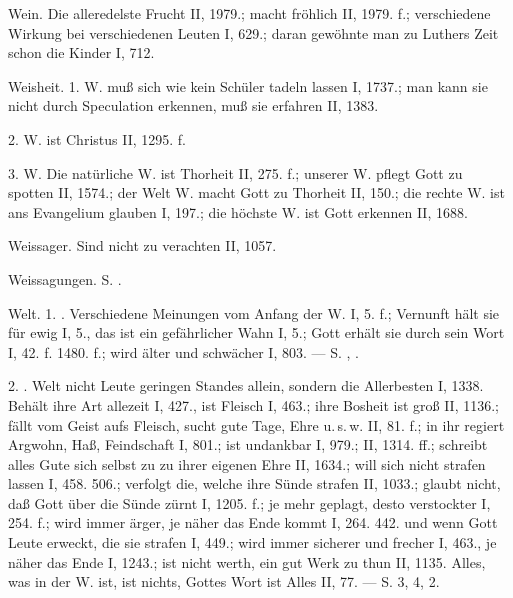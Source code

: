 Wein. Die alleredelste Frucht II, 1979.; macht fröhlich II, 1979. f.; verschiedene Wirkung bei verschiedenen Leuten I, 629.; daran gewöhnte man zu Luthers Zeit schon die Kinder I, 712.

Weisheit. 1.  W. muß sich wie kein Schüler tadeln lassen I, 1737.; man kann sie nicht durch Speculation erkennen, muß sie erfahren II, 1383.

2.  W. ist Christus II, 1295. f.

3.  W. Die natürliche W. ist Thorheit II, 275. f.; unserer W. pflegt Gott zu spotten II, 1574.; der Welt W. macht Gott zu Thorheit II, 150.; die rechte W. ist ans Evangelium glauben I, 197.; die höchste W. ist Gott erkennen II, 1688.

Weissager. Sind nicht zu verachten II, 1057.

Weissagungen. S. .

Welt. 1. . Verschiedene Meinungen vom Anfang der W. I, 5. f.; Vernunft hält sie für ewig I, 5., das ist ein gefährlicher Wahn I, 5.; Gott erhält sie durch sein Wort I, 42. f. 1480. f.; wird älter und schwächer I, 803. — S. , .

2. . Welt  nicht Leute geringen Standes allein, sondern die Allerbesten I, 1338. Behält ihre Art allezeit I, 427., ist Fleisch I, 463.; ihre Bosheit ist groß II, 1136.; fällt vom Geist aufs Fleisch, sucht gute Tage, Ehre u.\,s.\,w. II, 81. f.; in ihr regiert Argwohn, Haß, Feindschaft I, 801.; ist undankbar I, 979.; II, 1314. ff.; schreibt alles Gute sich selbst zu zu ihrer eigenen Ehre II, 1634.; will sich nicht strafen lassen I, 458. 506.; verfolgt die, welche ihre Sünde strafen II, 1033.; glaubt nicht, daß Gott über die Sünde zürnt I, 1205. f.; je mehr geplagt, desto verstockter I, 254. f.; wird immer ärger, je näher das Ende kommt I, 264. 442. und wenn Gott Leute erweckt, die sie strafen I, 449.; wird immer sicherer und frecher I, 463., je näher das Ende I, 1243.; ist nicht werth, ein gut Werk zu thun II, 1135. Alles, was in der W. ist, ist nichts, Gottes Wort ist Alles II, 77. — S.  3, 4,  2.

